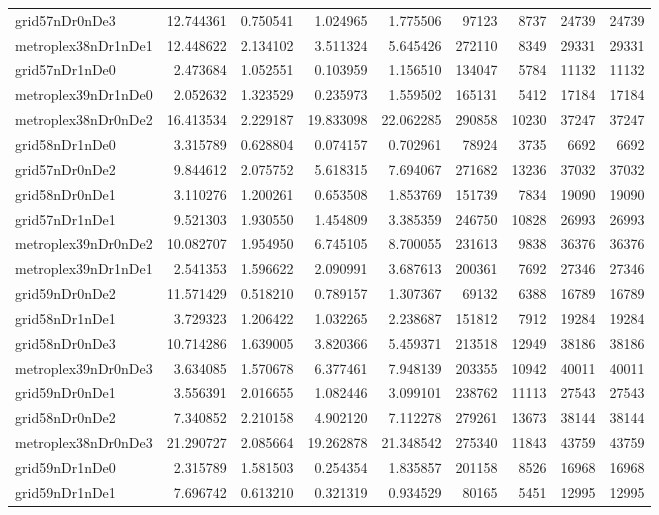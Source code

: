 \documentclass[../../../thesis.tex]{subfiles}
\begin{document}
\begin{longtable}{|l|r|r|r|r|r|r|r|r|}
grid57nDr0nDe3 & 12.744361 & 0.750541 & 1.024965 & 1.775506 & 97123 & 8737 & 24739 & 24739 \\
metroplex38nDr1nDe1 & 12.448622 & 2.134102 & 3.511324 & 5.645426 & 272110 & 8349 & 29331 & 29331 \\
grid57nDr1nDe0 & 2.473684 & 1.052551 & 0.103959 & 1.156510 & 134047 & 5784 & 11132 & 11132 \\
metroplex39nDr1nDe0 & 2.052632 & 1.323529 & 0.235973 & 1.559502 & 165131 & 5412 & 17184 & 17184 \\
metroplex38nDr0nDe2 & 16.413534 & 2.229187 & 19.833098 & 22.062285 & 290858 & 10230 & 37247 & 37247 \\
grid58nDr1nDe0 & 3.315789 & 0.628804 & 0.074157 & 0.702961 & 78924 & 3735 & 6692 & 6692 \\
grid57nDr0nDe2 & 9.844612 & 2.075752 & 5.618315 & 7.694067 & 271682 & 13236 & 37032 & 37032 \\
grid58nDr0nDe1 & 3.110276 & 1.200261 & 0.653508 & 1.853769 & 151739 & 7834 & 19090 & 19090 \\
grid57nDr1nDe1 & 9.521303 & 1.930550 & 1.454809 & 3.385359 & 246750 & 10828 & 26993 & 26993 \\
metroplex39nDr0nDe2 & 10.082707 & 1.954950 & 6.745105 & 8.700055 & 231613 & 9838 & 36376 & 36376 \\
metroplex39nDr1nDe1 & 2.541353 & 1.596622 & 2.090991 & 3.687613 & 200361 & 7692 & 27346 & 27346 \\
grid59nDr0nDe2 & 11.571429 & 0.518210 & 0.789157 & 1.307367 & 69132 & 6388 & 16789 & 16789 \\
grid58nDr1nDe1 & 3.729323 & 1.206422 & 1.032265 & 2.238687 & 151812 & 7912 & 19284 & 19284 \\
grid58nDr0nDe3 & 10.714286 & 1.639005 & 3.820366 & 5.459371 & 213518 & 12949 & 38186 & 38186 \\
metroplex39nDr0nDe3 & 3.634085 & 1.570678 & 6.377461 & 7.948139 & 203355 & 10942 & 40011 & 40011 \\
grid59nDr0nDe1 & 3.556391 & 2.016655 & 1.082446 & 3.099101 & 238762 & 11113 & 27543 & 27543 \\
grid58nDr0nDe2 & 7.340852 & 2.210158 & 4.902120 & 7.112278 & 279261 & 13673 & 38144 & 38144 \\
metroplex38nDr0nDe3 & 21.290727 & 2.085664 & 19.262878 & 21.348542 & 275340 & 11843 & 43759 & 43759 \\
grid59nDr1nDe0 & 2.315789 & 1.581503 & 0.254354 & 1.835857 & 201158 & 8526 & 16968 & 16968 \\
grid59nDr1nDe1 & 7.696742 & 0.613210 & 0.321319 & 0.934529 & 80165 & 5451 & 12995 & 12995 \\

\end{longtable}
\end{document}
